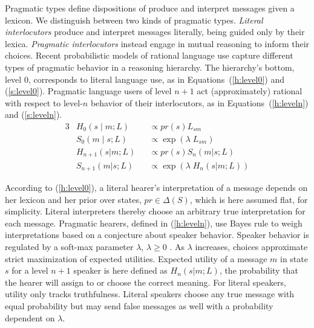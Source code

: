 \documentclass[a4paper, 11pt]{article}
\theoremstyle{Satz}
\newcommand{\state}{\ensuremath{s}\xspace}		%
\newcommand{\messg}{\ensuremath{m}\xspace}		%
\begin{document}
Pragmatic types define dispositions of produce and interpret messages given a lexicon. We
distinguish between two kinds of pragmatic types. {\em Literal interlocutors} produce and
interpret messages literally, being guided only by their lexica. {\em Pragmatic interlocutors}
instead engage in mutual reasoning to inform their choices. Recent probabilistic models of
rational language use
\citep{frank+goodman:2012,FrankeJager2015:Probabilistic-p,GoodmanFrank2016:Pragmatic-Langu}
capture different types of pragmatic behavior in a reasoning hierarchy. The hierarchy's bottom,
level $0$, corresponds to literal language use, as in Equations~(\ref{h:level0}) and
(\ref{s:level0}). Pragmatic language users of level $n + 1$ act (approximately) rational with
respect to level-$n$ behavior of their interlocutors, as in Equations~(\ref{h:leveln}) and
(\ref{s:leveln}).
\begin{alignat}{3}
&H_{0}(s \mid m;L) &&\propto pr(s) L_{sm} \label{h:level0}\\
&S_{0}(m \mid s;L) &&\propto \exp(\lambda \; L_{sm}) \label{s:level0}\\
&H_{n+1}(s|m;L) &&\propto pr(s) S_{n}(m|s;L) \label{h:leveln}\\
&S_{n+1}(m|s;L) &&\propto  \exp(\lambda \; H_{n}(s|m;L)) \label{s:leveln}
\end{alignat}

According to (\ref{h:level0}), a literal hearer's interpretation of a message depends on her
lexicon and her prior over states, $pr \in \Delta(S)$, which is here assumed flat, for
simplicity. Literal interpreters thereby choose an arbitrary true interpretation for each
message. Pragmatic hearers, defined in (\ref{h:leveln}), use Bayes rule to weigh
interpretations based on a conjecture about speaker behavior. Speaker behavior is regulated by
a soft-max parameter $\lambda$, $\lambda \geq 0$ \citep{luce:1959,sutton+barto:1998}. As
$\lambda$ increases, choices approximate strict maximization of expected utilities. Expected
utility of a message $\messg$ in state $\state$ for a level $n+1$ speaker is here defined as
$H_{n}(s|m;L)$, the probability that the hearer will assign to or choose the correct
meaning. For literal speakers, utility only tracks truthfulness. Literal speakers choose any
true message with equal probability but may send false messages as well with a probability
dependent on $\lambda$.
\end{document}
